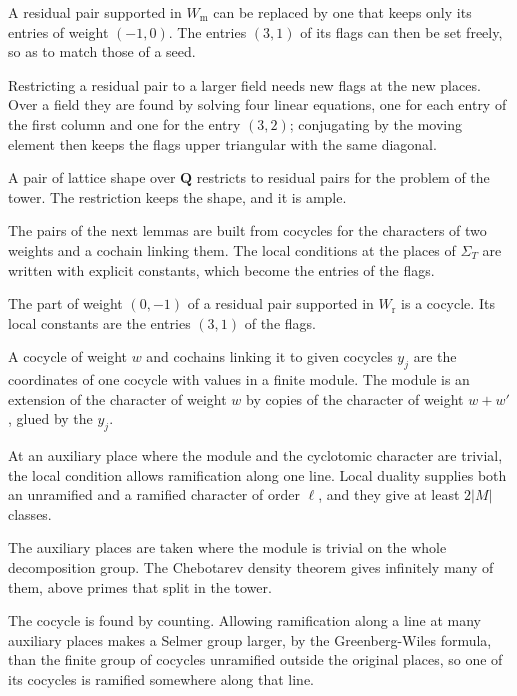 A residual pair supported in $W_{\mathrm m}$ can be replaced by one that keeps only its entries of weight $(-1,0)$. The entries $(3,1)$ of its flags can then be set freely, so as to match those of a seed.

Restricting a residual pair to a larger field needs new flags at the new places. Over a field they are found by solving four linear equations, one for each entry of the first column and one for the entry $(3,2)$; conjugating by the moving element then keeps the flags upper triangular with the same diagonal.

A pair of lattice shape over $\mathbf Q$ restricts to residual pairs for the problem of the tower. The restriction keeps the shape, and it is ample.

The pairs of the next lemmas are built from cocycles for the characters of two weights and a cochain linking them. The local conditions at the places of $\Sigma_T$ are written with explicit constants, which become the entries of the flags.

The part of weight $(0,-1)$ of a residual pair supported in $W_{\mathrm r}$ is a cocycle. Its local constants are the entries $(3,1)$ of the flags.

A cocycle of weight $w$ and cochains linking it to given cocycles $y_j$ are the coordinates of one cocycle with values in a finite module. The module is an extension of the character of weight $w$ by copies of the character of weight $w+w'$, glued by the $y_j$.

At an auxiliary place where the module and the cyclotomic character are trivial, the local condition allows ramification along one line. Local duality supplies both an unramified and a ramified character of order $\ell$, and they give at least $2|M|$ classes.

The auxiliary places are taken where the module is trivial on the whole decomposition group. The Chebotarev density theorem gives infinitely many of them, above primes that split in the tower.

The cocycle is found by counting. Allowing ramification along a line at many auxiliary places makes a Selmer group larger, by the Greenberg-Wiles formula, than the finite group of cocycles unramified outside the original places, so one of its cocycles is ramified somewhere along that line.

